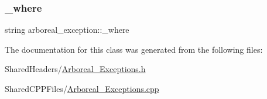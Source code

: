 \mbox{\label{classarboreal__exception_a73559e45af28b0804b66b04df4c04270}} 
\subsubsection{\texorpdfstring{\+\_\+where}{\_where}}
{\footnotesize\ttfamily string arboreal\+\_\+exception\+::\+\_\+where\hspace{0.3cm}{\ttfamily [protected]}}



The documentation for this class was generated from the following files\+:\begin{DoxyCompactItemize}
\item 
Shared\+Headers/\mbox{\hyperlink{_arboreal___exceptions_8h}{Arboreal\+\_\+\+Exceptions.\+h}}\item 
Shared\+C\+P\+P\+Files/\mbox{\hyperlink{_arboreal___exceptions_8cpp}{Arboreal\+\_\+\+Exceptions.\+cpp}}\end{DoxyCompactItemize}
